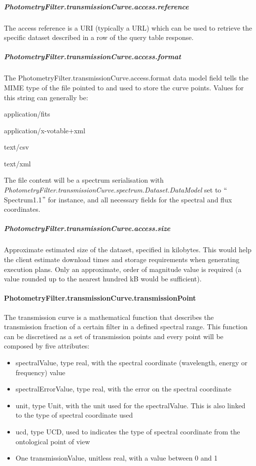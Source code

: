 \documentclass[11pt,a4paper]{ivoa}
\begin{document}
\subparagraph{PhotometryFilter.transmissionCurve.access.reference}

The access reference is a URI (typically a URL) which can be used to retrieve the
specific dataset described in a row of the query table response. \par

\subparagraph{PhotometryFilter.transmissionCurve.access.format}
The PhotometryFilter.transmissionCurve.access.format data model field tells the MIME
type of the file pointed to and used to store the curve points. Values for this
string can generally be:\par

application/fits \par
application/x-votable+xml \par
text/csv \par
text/xml
\bigskip



The file content will be a spectrum serialisation with
\textit{PhotometryFilter.transmissionCurve.spectrum.Dataset.DataModel} set to
$``$Spectrum1.1$"$  for instance, and all necessary fields for the spectral and
flux coordinates.
\par

\subparagraph{PhotometryFilter.transmissionCurve.access.size}
Approximate estimated size of the dataset, specified in kilobytes. This would
help the client estimate download times and storage requirements when generating
execution plans. Only an approximate, order of magnitude value is required (a value
rounded up to the nearest hundred kB would be sufficient).\par

\paragraph{PhotometryFilter.transmissionCurve.transmissionPoint}
The transmission curve is a mathematical function that describes the transmission
fraction of a certain filter in a defined spectral range. This function can be discretised
as a set of transmission points and every point will be composed by five attributes:
\par

\begin{itemize}
	\item{spectralValue, type real, with the spectral coordinate (wavelength, energy or frequency) value}
	\item{spectralErrorValue, type real, with the error on the spectral coordinate}
	\item{unit, type Unit, with the unit used for the spectralValue. This is also linked to the type of spectral coordinate used}
	\item{ucd, type UCD, used to indicates the type of spectral coordinate from the ontological point of view}
	\item{One transmissionValue, unitless real, with a value between 0 and 1}
\end{itemize}
\end{document}
